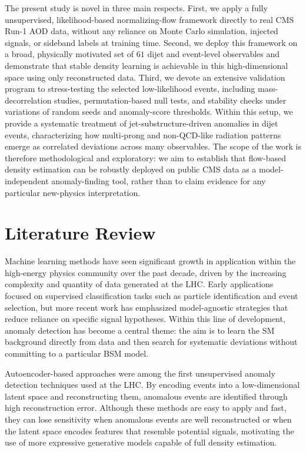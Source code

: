 \documentclass[11pt,a4paper,twocolumn]{article}
\begin{document}
The present study is novel in three main respects. First, we apply a fully unsupervised, likelihood-based normalizing-flow framework directly to real CMS Run-1 AOD data, without any reliance on Monte Carlo simulation, injected signals, or sideband labels at training time. Second, we deploy this framework on a broad, physically motivated set of $61$ dijet and event-level observables and demonstrate that stable density learning is achievable in this high-dimensional space using only reconstructed data. Third, we devote an extensive validation program to stress-testing the selected low-likelihood events, including mass-decorrelation studies, permutation-based null tests, and stability checks under variations of random seeds and anomaly-score thresholds. Within this setup, we provide a systematic treatment of jet-substructure-driven anomalies in dijet events, characterizing how multi-prong and non-QCD-like radiation patterns emerge as correlated deviations across many observables. The scope of the work is therefore methodological and exploratory: we aim to establish that flow-based density estimation can be robustly deployed on public CMS data as a model-independent anomaly-finding tool, rather than to claim evidence for any particular new-physics interpretation.

\section{Literature Review}

Machine learning methods have seen significant growth in application within the high-energy physics community over the past decade, driven by the increasing complexity and quantity of data generated at the LHC. Early applications focused on supervised classification tasks such as particle identification and event selection, but more recent work has emphasized model-agnostic strategies that reduce reliance on specific signal hypotheses. Within this line of development, anomaly detection has become a central theme: the aim is to learn the SM background directly from data and then search for systematic deviations without committing to a particular BSM model.

Autoencoder-based approaches were among the first unsupervised anomaly detection techniques used at the LHC. By encoding events into a low-dimensional latent space and reconstructing them, anomalous events are identified through high reconstruction error. Although these methods are easy to apply and fast, they can lose sensitivity when anomalous events are well reconstructed or when the latent space encodes features that resemble potential signals, motivating the use of more expressive generative models capable of full density estimation.
\end{document}
